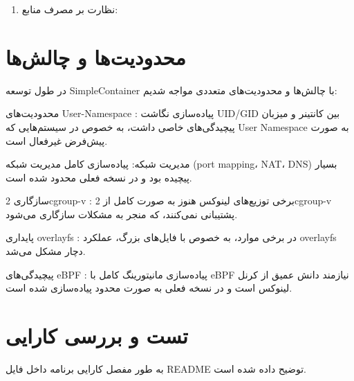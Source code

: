 \documentclass[10pt,a4paper]{article}
\begin{document}
\begin{enumerate}
{{	}
}

\item 
    نظارت بر مصرف منابع:

	{
}


\end{enumerate}

\pagebreak
\section{محدودیت‌ها و چالش‌ها}

در طول توسعه SimpleContainer با چالش‌ها و محدودیت‌های متعددی مواجه شدیم:



    محدودیت‌های User-Namespace : پیاده‌سازی نگاشت UID/GID بین کانتینر و میزبان پیچیدگی‌های خاصی داشت، به خصوص در سیستم‌هایی که User Namespace به صورت پیش‌فرض غیرفعال است.

    مدیریت شبکه: پیاده‌سازی کامل مدیریت شبکه (port mapping، NAT، DNS) بسیار پیچیده بود و در نسخه فعلی محدود شده است.

    سازگاری 2cgroup-v : برخی توزیع‌های لینوکس هنوز به صورت کامل از 2cgroup-v پشتیبانی نمی‌کنند، که منجر به مشکلات سازگاری می‌شود.

    پایداری overlayfs : در برخی موارد، به خصوص با فایل‌های بزرگ، عملکرد overlayfs دچار مشکل می‌شد.

    پیچیدگی‌های eBPF : پیاده‌سازی مانیتورینگ کامل با eBPF نیازمند دانش عمیق از کرنل لینوکس است و در نسخه فعلی به صورت محدود پیاده‌سازی شده است.

	\section{تست و بررسی کارایی}

	به طور مفصل کارایی برنامه داخل فایل README توضیح داده شده است.

\pagebreak
\end{document}
